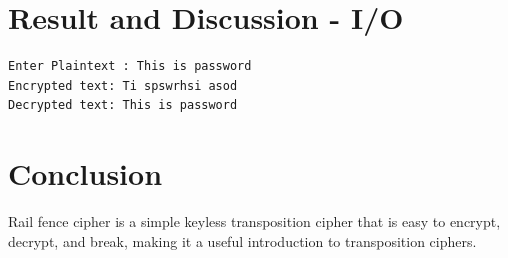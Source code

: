 \section{Result and Discussion - I/O}
\begin{verbatim}
Enter Plaintext : This is password
Encrypted text: Ti spswrhsi asod
Decrypted text: This is password
\end{verbatim}


\section{Conclusion}
Rail fence cipher is a simple keyless transposition cipher that is easy to encrypt, decrypt, and break, making it a useful introduction to transposition ciphers.
